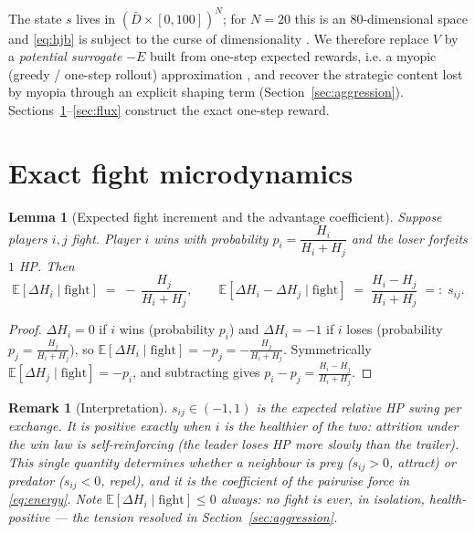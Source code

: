 \documentclass[11pt]{article}
\newtheorem{lemma}[theorem]{Lemma}
\newtheorem*{remark}{Remark}
\newcommand{\E}{\mathbb{E}}
\begin{document}
The state $s$ lives in $(\bar D\times[0,100])^N$; for $N=20$ this is an
$80$-dimensional space and \eqref{eq:hjb} is subject to the curse of
dimensionality \cite{Bertsekas}. We therefore replace $V$ by a
\emph{potential surrogate} $-E$ built from one-step expected rewards, i.e. a
myopic (greedy / one-step rollout) approximation \cite[Ch.~6]{Bertsekas}, and
recover the strategic content lost by myopia through an explicit shaping term
(Section~\ref{sec:aggression}). Sections~\ref{sec:fight}--\ref{sec:flux}
construct the exact one-step reward.

\newpage
\section{Exact fight microdynamics}\label{sec:fight}

\begin{lemma}[Expected fight increment and the advantage coefficient]
\label{lem:fight}
Suppose players $i,j$ fight. Player $i$ wins with probability
$p_i=\dfrac{H_i}{H_i+H_j}$ and the loser forfeits $1$ HP. Then
\begin{equation}\label{eq:fightexp}
  \E[\Delta H_i \mid \text{fight}] \;=\; -\,\frac{H_j}{H_i+H_j},
  \qquad
  \E[\Delta H_i-\Delta H_j \mid \text{fight}] \;=\; \frac{H_i-H_j}{H_i+H_j}\;=:\;s_{ij}.
\end{equation}
\end{lemma}

\begin{proof}
$\Delta H_i=0$ if $i$ wins (probability $p_i$) and $\Delta H_i=-1$ if $i$ loses
(probability $p_j=\tfrac{H_j}{H_i+H_j}$), so
$\E[\Delta H_i\mid\text{fight}]=-p_j=-\tfrac{H_j}{H_i+H_j}$. Symmetrically
$\E[\Delta H_j\mid\text{fight}]=-p_i$, and subtracting gives
$p_i-p_j=\tfrac{H_i-H_j}{H_i+H_j}$.
\end{proof}

\begin{remark}[Interpretation]
$s_{ij}\in(-1,1)$ is the \emph{expected relative HP swing per exchange}. It is
positive exactly when $i$ is the healthier of the two: attrition under the win
law is self-reinforcing (the leader loses HP more slowly than the trailer). This
single quantity determines whether a neighbour is prey ($s_{ij}>0$, attract) or
predator ($s_{ij}<0$, repel), and it is the coefficient of the pairwise force in
\eqref{eq:energy}. Note $\E[\Delta H_i\mid\text{fight}]\le 0$ always: no fight is
ever, in isolation, health-positive --- the tension resolved in
Section~\ref{sec:aggression}.
\end{remark}
\end{document}
